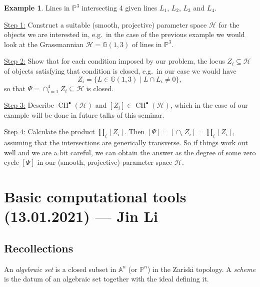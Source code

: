 \documentclass[12pt,a4paper]{amsart}
\theoremstyle{plain}
\theoremstyle{definition}
\newtheorem{exmp}[thm]{Example}
\theoremstyle{remark}
\begin{document}
\begin{exmp}
    Lines in $\mathbb{P}^{3}$ intersecting 4 given lines $L_{1}$, $L_{2}$, $L_{3}$ and $L_{4}$.
\end{exmp}

\textbullet\underline{Step 1:} Construct a suitable (smooth, projective) parameter space $\mathcal{H}$ for the objects we are interested in, e.g.~in the case of the previous example we would look at the Grassmannian $\mathcal{H}=\mathbb{G}(1,3)$ of lines in $\mathbb{P}^{3}$.

\textbullet\underline{Step 2:} Show that for each condition imposed by our problem, the locus $Z_{i}\subseteq \mathcal{H}$ of objects satisfying that condition is closed, e.g.~in our case we would have
\[ Z_{i}=\{ L\in \mathbb{G}(1,3)\mid L\cap L_{i}\neq 0 \}, \]
so that $\Psi=\cap_{i=1}^{4}Z_{i}\subseteq \mathcal{H}$ is closed.

\textbullet\underline{Step 3:} Describe $\operatorname{CH}^{\bullet}(\mathcal{H})$ and $[Z_{i}]\in \operatorname{CH}^{\bullet}(\mathcal{H})$, which in the case of our example will be done in future talks of this seminar.

\textbullet\underline{Step 4:} Calculate the product $\prod_{i}[Z_{i}]$.
Then $[\Psi]=[\cap_{i}Z_{i}]=\prod_{i}[Z_{i}]$, assuming that the intersections are generically transverse.
So if things work out well and we are a bit careful, we can obtain the answer as the degree \cite[Propostion 1.21]{eh16} of some zero cycle $[\Psi]$ in our (smooth, projective) parameter space $\mathcal{H}$.

\section{Basic computational tools (13.01.2021) --- Jin Li}

\subsection{Recollections}

An \textit{algebraic set} is a closed subset in $\mathbb{A}^{n}$ (or $\mathbb{P}^{n}$) in the Zariski topology.
A \textit{scheme} is the datum of an algebraic set together with the ideal defining it.
\end{document}
